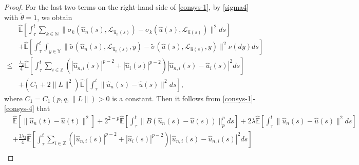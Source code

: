 \documentclass[10pt,a4paper]{amsart}
\begin{document}
\begin{proof}
  For the last two terms on the right-hand side of \eqref{consys-1},
  by \eqref{sigma4} with $\tilde{\theta} = 1$, we obtain
 \begin{align}\label{consys-4}
        & \widehat{\mathbb{E}}
             \left[ \int_{\tau}^{t}
                       \sum_{k \in \mathbb{N} }
                             \| \sigma_k(\hat{u}_n(s),\mathcal{L}_{\hat{u}_n(s)}) - \sigma_k(\hat{u}(s),\mathcal{L}_{\hat{u}(s)})\|^2 ds
             \right]  \nonumber\\
        & + \widehat{\mathbb{E}}
               \left[ \int_{\tau}^{t}  \int_{
               y\in\mathbb{Y}
               }
                               \| \widetilde{\sigma}(\hat{u}_n(s),\mathcal{L}_{\hat{u}_n(s)},y)
                                   - \widetilde{\sigma}(\hat{u}(s),\mathcal{L}_{\hat{u}(s)},y)
                               \|^2 \nu(dy) ds
               \right]  \nonumber\\
      \le & \frac{\lambda_2}{4}
             \widehat{\mathbb{E}}
                \left[\int_{\tau}^{t} \sum_{i \in \mathbb{Z}}
                            \left( |\hat{u}_{n,i}(s)|^{p-2} + |\hat{u}_i(s)|^{p-2}
                            \right)
                            |\hat{u}_{n,i}(s) - \hat{u}_i(s)|^2 ds
                \right]  \nonumber\\
        & + \left(  C_1
             + 2 \| L \|^2
            \right)
            \widehat{\mathbb{E}}
                        \left[ \int_{\tau}^{t}
                                     \|\hat{u}_n(s) - \hat{u}(s)\|^2 ds
                        \right],
 \end{align}
 where $C_1 = C_1(p, q, \|L\|)>0$
 is a constant.
 Then it follows from \eqref{consys-1}-\eqref{consys-4} that
 \begin{align}\label{consys-5}
        & \widehat{\mathbb{E}} \left[ \|\hat{u}_n(t) - \hat{u}(t)\|^2 \right]
          + 2^{2-p} \widehat{\mathbb{E}}
              \left[ \int_{\tau}^{t}
                        \| B (\hat{u}_n(s) -  \hat{u}(s) ) \|_p^p ds
              \right]
          + 2 \lambda \widehat{\mathbb{E}}
              \left[ \int_{\tau}^{t} \|\hat{u}_n(s) - \hat{u}(s)\|^2 ds
              \right]  \nonumber\\
        & + \frac{3\lambda_2}{4} \widehat{\mathbb{E}}
             \left[ \int_{\tau}^{t}
                       \sum_{i \in \mathbb{Z}}
                         \left( |\hat{u}_{n,i}(s)|^{p-2} + |\hat{u}_{i}(s)|^{p-2}
                         \right) |\hat{u}_{n,i}(s) - \hat{u}_{n,i}(s)|^2 ds
             \right]  \nonumber\\

\end{align}
\end{proof}
\end{document}
